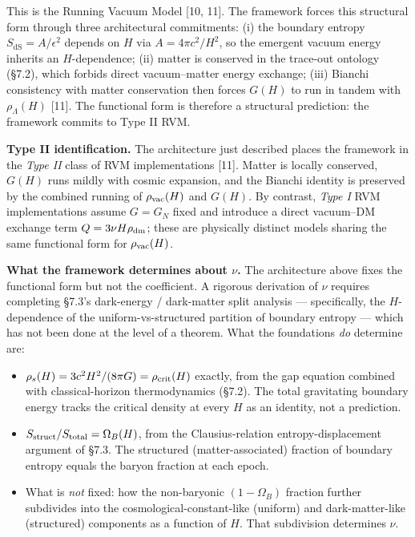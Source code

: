 \documentclass[
]{article}
\providecommand{\tightlist}{%
  \setlength{\itemsep}{0pt}\setlength{\parskip}{0pt}}
\begin{document}
This is the Running Vacuum Model {[}10, 11{]}. The framework forces this
structural form through three architectural commitments: (i) the
boundary entropy \(S_{\text{dS}} = A/\epsilon^2\) depends on \(H\) via
\(A = 4\pi c^2/H^2\), so the emergent vacuum energy inherits an
\(H\)-dependence; (ii) matter is conserved in the trace-out ontology
(§7.2), which forbids direct vacuum--matter energy exchange; (iii)
Bianchi consistency with matter conservation then forces \(G(H)\) to run
in tandem with \(\rho_\Lambda(H)\) {[}11{]}. The functional form is
therefore a structural prediction: the framework commits to Type II RVM.

\textbf{Type II identification.} The architecture just described places
the framework in the \emph{Type II} class of RVM implementations
{[}11{]}. Matter is locally conserved, \(G(H)\) runs mildly with cosmic
expansion, and the Bianchi identity is preserved by the combined running
of \(\rho_{\rm vac}(H)\) and \(G(H)\). By contrast, \emph{Type I} RVM
implementations assume \(G = G_N\) fixed and introduce a direct
vacuum--DM exchange term \(Q = 3\nu H \rho_{\rm dm}\); these are
physically distinct models sharing the same functional form for
\(\rho_{\rm vac}(H)\).

\textbf{What the framework determines about \(\nu\).} The architecture
above fixes the functional form but not the coefficient. A rigorous
derivation of \(\nu\) requires completing §7.3's dark-energy /
dark-matter split analysis --- specifically, the \(H\)-dependence of the
uniform-vs-structured partition of boundary entropy --- which has not
been done at the level of a theorem. What the foundations \emph{do}
determine are:

\begin{itemize}
\tightlist
\item
  \(\rho_s(H) = 3c^2 H^2/(8\pi G) = \rho_{\rm crit}(H)\) exactly, from
  the gap equation combined with classical-horizon thermodynamics
  (§7.2). The total gravitating boundary energy tracks the critical
  density at every \(H\) as an identity, not a prediction.
\item
  \(S_{\rm struct}/S_{\rm total} = \Omega_B(H)\), from the
  Clausius-relation entropy-displacement argument of §7.3. The
  structured (matter-associated) fraction of boundary entropy equals the
  baryon fraction at each epoch.
\item
  What is \emph{not} fixed: how the non-baryonic \((1 - \Omega_B)\)
  fraction further subdivides into the cosmological-constant-like
  (uniform) and dark-matter-like (structured) components as a function
  of \(H\). That subdivision determines \(\nu\).
\end{itemize}
\end{document}
